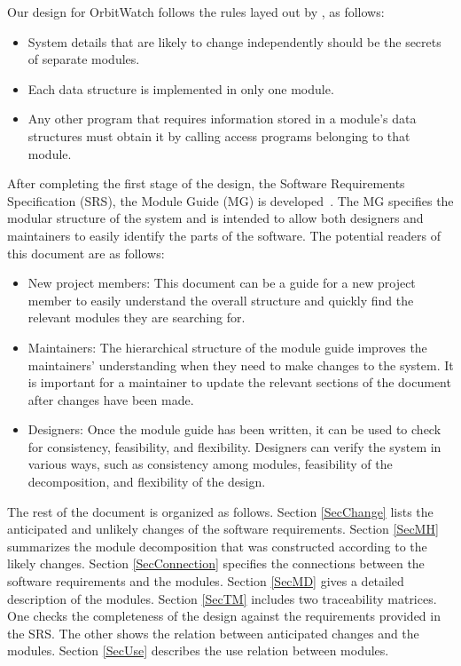 \documentclass[12pt, titlepage]{article}
\begin{document}
Our design for OrbitWatch follows the rules layed out by \citet{ParnasEtAl1984}, as follows:
\begin{itemize}
\item System details that are likely to change independently should be the
  secrets of separate modules.
\item Each data structure is implemented in only one module.
\item Any other program that requires information stored in a module's data
  structures must obtain it by calling access programs belonging to that module.
\end{itemize}

After completing the first stage of the design, the Software Requirements
Specification (SRS), the Module Guide (MG) is developed~\citep{ParnasEtAl1984}. The MG
specifies the modular structure of the system and is intended to allow both
designers and maintainers to easily identify the parts of the software.  The
potential readers of this document are as follows:

\begin{itemize}
\item New project members: This document can be a guide for a new project member
  to easily understand the overall structure and quickly find the
  relevant modules they are searching for.
\item Maintainers: The hierarchical structure of the module guide improves the
  maintainers' understanding when they need to make changes to the system. It is
  important for a maintainer to update the relevant sections of the document
  after changes have been made.
\item Designers: Once the module guide has been written, it can be used to
  check for consistency, feasibility, and flexibility. Designers can verify the
  system in various ways, such as consistency among modules, feasibility of the
  decomposition, and flexibility of the design.
\end{itemize}

The rest of the document is organized as follows. Section
\ref{SecChange} lists the anticipated and unlikely changes of the software
requirements. Section \ref{SecMH} summarizes the module decomposition that
was constructed according to the likely changes. Section \ref{SecConnection}
specifies the connections between the software requirements and the
modules. Section \ref{SecMD} gives a detailed description of the
modules. Section \ref{SecTM} includes two traceability matrices. One checks
the completeness of the design against the requirements provided in the SRS. The
other shows the relation between anticipated changes and the modules. Section
\ref{SecUse} describes the use relation between modules.
\end{document}
